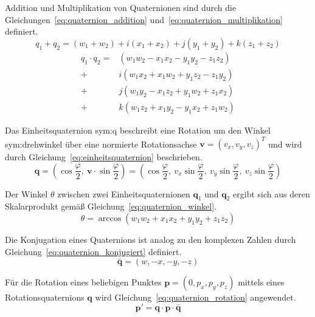 Addition und Multiplikation von Quaternionen sind durch die Gleichungen~\ref{eq:quaternion_addition} und~\ref{eq:quaternion_multiplikation} definiert.
\begin{equation}
q_1 + q_2 = (w_1 + w_2) + i(x_1 + x_2) + j(y_1 + y_2) + k(z_1 + z_2)
\label{eq:quaternion_addition}
\end{equation}
\begin{equation}
\begin{split}
q_1 \cdot q_2 = &(w_1 w_2 - x_1 x_2 - y_1 y_2 - z_1 z_2) \\
+ &i(w_1 x_2 + x_1 w_2 + y_1 z_2 - z_1 y_2) \\
+ &j(w_1 y_2 - x_1 z_2 + y_1 w_2 + z_1 x_2) \\
+ &k(w_1 z_2 + x_1 y_2 - y_1 x_2 + z_1 w_2)
\end{split}
\label{eq:quaternion_multiplikation}
\end{equation}

Das Einheitsquaternion \gls{sym:q} beschreibt eine Rotation um den Winkel \gls{sym:drehwinkel} über eine normierte Rotationsachse
$\mathbf{v} = (v_x, v_y, v_z)^T$ und wird durch Gleichung~\ref{eq:einheitsquaternion} beschrieben.~\cite{2016}
\begin{equation}
\mathbf{q} = \left(\cos\frac{\varphi}{2},\ \mathbf{v} \cdot \sin\frac{\varphi}{2}\right) = \left(\cos\frac{\varphi}{2},\ v_x \sin\frac{\varphi}{2},\ v_y \sin\frac{\varphi}{2},\ v_z \sin\frac{\varphi}{2}\right)
\label{eq:einheitsquaternion}
\end{equation}

Der Winkel \(\theta\) zwischen zwei Einheitsquaternionen $\mathbf{q}_1$ und $\mathbf{q}_2$ ergibt sich aus deren Skalarprodukt gemäß Gleichung~\ref{eq:quaternion_winkel}.
\begin{equation}
\theta = \arccos\!\left(w_1 w_2 + x_1 x_2 + y_1 y_2 + z_1 z_2\right)
\label{eq:quaternion_winkel}
\end{equation}

Die Konjugation eines Quaternions ist analog zu den komplexen Zahlen durch Gleichung~\ref{eq:quaternion_konjugiert} definiert.
\begin{equation}
\bar{\mathbf{q}} = (w, -x, -y, -z)
\label{eq:quaternion_konjugiert}
\end{equation}

Für die Rotation eines beliebigen Punktes $\mathbf{p} = (0, p_x, p_y, p_z)$ mittels eines Rotationsquaternions $\mathbf{q}$ wird Gleichung~\ref{eq:quaternion_rotation} angewendet.~\cite{Quan2017}
\begin{equation}
\mathbf{p}' = \mathbf{q} \cdot \mathbf{p} \cdot \bar{\mathbf{q}}
\label{eq:quaternion_rotation}
\end{equation}

